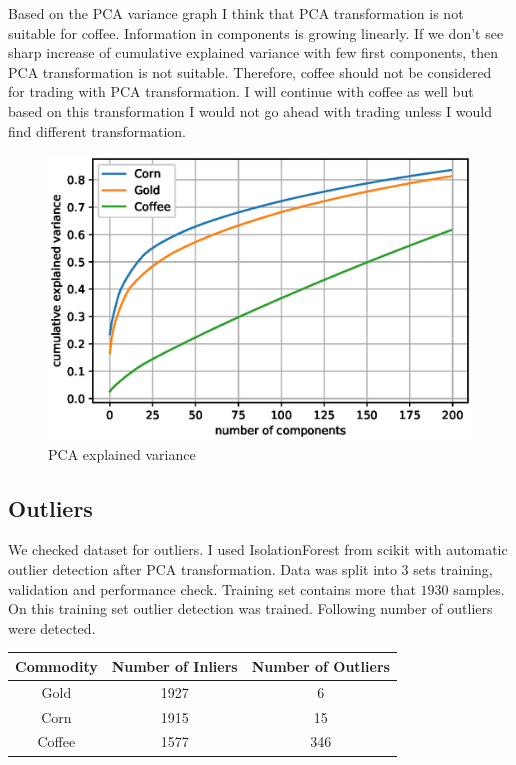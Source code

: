 \documentclass[final,2p]{elsarticle}
\begin{document}
Based on the PCA variance graph I think that PCA transformation is not suitable for coffee. Information in components is growing linearly. If we don't see sharp increase of cumulative explained variance with few first components, then PCA transformation is not suitable. Therefore, coffee should not be considered for trading with PCA transformation. I will continue with coffee as well but based on this transformation I would not go ahead with trading unless I would find different transformation.
\begin{figure}[h]
    \centering
    \includegraphics{figures/pca.eps}
    \caption{PCA explained variance}
\end{figure}

\subsection{Outliers}
We checked dataset for outliers. I used IsolationForest from scikit with automatic outlier detection after PCA transformation.
Data was split into 3 sets training, validation and performance check.
Training set contains more that $1930$ samples. On this training set outlier detection was trained.
Following number of outliers were detected.

\begin{center}
\begin{tabular}{ccc}
    Commodity & Number of Inliers & Number of Outliers \\
    \hline
    Gold & 1927 & 6 \\
    Corn & 1915 & 15 \\
    Coffee & 1577 & 346 \\
\end{tabular}
\end{center}
\end{document}
